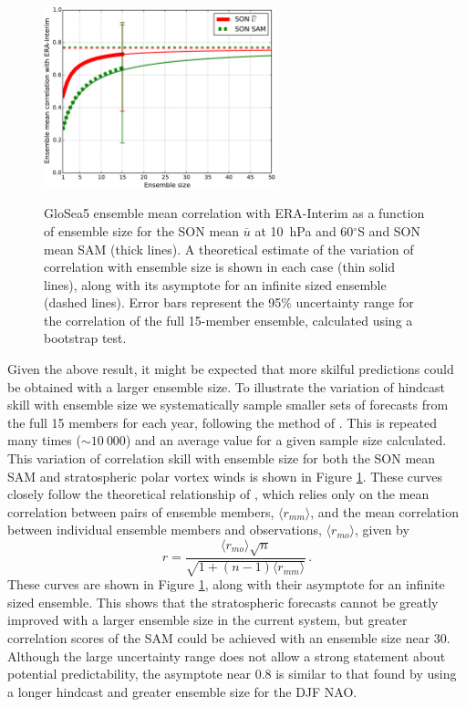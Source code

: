\begin{figure}[t]
  \centering
  \noindent\includegraphics[width=0.6\textwidth,angle=0]{figures/chapter-seasonal/corr_ens_size_crop.pdf}\\
  \caption[Variation of GloSea5 forecast skill with ensemble size]{GloSea5
    ensemble mean correlation with ERA-Interim as a function of ensemble size
    for the SON mean $\overline{u}$ at 10~hPa and 60$^{\circ}$S and SON mean SAM
    (thick lines). A theoretical estimate of the variation of correlation with
    ensemble size is shown in each case (thin solid lines), along with its
    asymptote for an infinite sized ensemble (dashed lines). Error bars
    represent the 95\% uncertainty range for the correlation of the full
    15-member ensemble, calculated using a bootstrap
    test.}\label{fig:corr_ens_size_sh}
\end{figure}

Given the above result, it might be expected that more skilful predictions could
be obtained with a larger ensemble size. To illustrate the variation of hindcast
skill with ensemble size we systematically sample smaller sets of forecasts from
the full 15 members for each year, following the method of
\citet{Scaife2013}. This is repeated many times ($\sim 10~000$) and an average
value for a given sample size calculated. This variation of correlation skill
with ensemble size for both the SON mean SAM and stratospheric polar vortex
winds is shown in Figure \ref{fig:corr_ens_size_sh}. These curves closely follow
the theoretical relationship of \citet{Murphy1990}, which relies only on the
mean correlation between pairs of ensemble members, $\langle r_{mm} \rangle$,
and the mean correlation between individual ensemble members and observations,
$\langle r_{mo} \rangle$, given by
\begin{equation}
r = \frac{\langle r_{mo} \rangle \sqrt{n}}{\sqrt{1+(n-1)\langle r_{mm} \rangle}}
\, .
\end{equation} 
These curves are shown in Figure \ref{fig:corr_ens_size_sh}, along with their
asymptote for an infinite sized ensemble. This shows that the stratospheric
forecasts cannot be greatly improved with a larger ensemble size in the current
system, but greater correlation scores of the SAM could be achieved with an
ensemble size near 30. Although the large uncertainty range does not allow a
strong statement about potential predictability, the asymptote near 0.8 is
similar to that found by \citet{Scaife2013} using a longer hindcast and greater
ensemble size for the DJF NAO.

